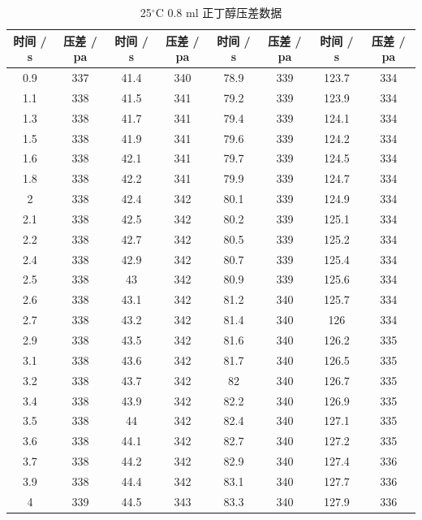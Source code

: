 \documentclass[12pt]{ctexart}
\numberwithin{equation}{section}
\begin{document}
\begin{longtable}{cc|cc|cc|cc}
    \caption{25$^\circ$C  0.8 ml 正丁醇压差数据} \\
    \hline
    时间 / s & 压差 / pa & 时间 / s & 压差 / pa & 时间 / s & 压差 / pa & 时间 / s & 压差 / pa \\
    \hline
    0.9  &  337  &  41.4  &  340  &  78.9  &  339  &  123.7  &  334  \\
1.1  &  338  &  41.5  &  341  &  79.2  &  339  &  123.9  &  334  \\
1.3  &  338  &  41.7  &  341  &  79.4  &  339  &  124.1  &  334  \\
1.5  &  338  &  41.9  &  341  &  79.6  &  339  &  124.2  &  334  \\
1.6  &  338  &  42.1  &  341  &  79.7  &  339  &  124.5  &  334  \\
1.8  &  338  &  42.2  &  341  &  79.9  &  339  &  124.7  &  334  \\
2  &  338  &  42.4  &  342  &  80.1  &  339  &  124.9  &  334  \\
2.1  &  338  &  42.5  &  342  &  80.2  &  339  &  125.1  &  334  \\
2.2  &  338  &  42.7  &  342  &  80.5  &  339  &  125.2  &  334  \\
2.4  &  338  &  42.9  &  342  &  80.7  &  339  &  125.4  &  334  \\
2.5  &  338  &  43  &  342  &  80.9  &  339  &  125.6  &  334  \\
2.6  &  338  &  43.1  &  342  &  81.2  &  340  &  125.7  &  334  \\
2.7  &  338  &  43.2  &  342  &  81.4  &  340  &  126  &  334  \\
2.9  &  338  &  43.5  &  342  &  81.6  &  340  &  126.2  &  335  \\
3.1  &  338  &  43.6  &  342  &  81.7  &  340  &  126.5  &  335  \\
3.2  &  338  &  43.7  &  342  &  82  &  340  &  126.7  &  335  \\
3.4  &  338  &  43.9  &  342  &  82.2  &  340  &  126.9  &  335  \\
3.5  &  338  &  44  &  342  &  82.4  &  340  &  127.1  &  335  \\
3.6  &  338  &  44.1  &  342  &  82.7  &  340  &  127.2  &  335  \\
3.7  &  338  &  44.2  &  342  &  82.9  &  340  &  127.4  &  336  \\
3.9  &  338  &  44.4  &  342  &  83.1  &  340  &  127.7  &  336  \\
4  &  339  &  44.5  &  343  &  83.3  &  340  &  127.9  &  336  \\

\end{longtable}
\end{document}
